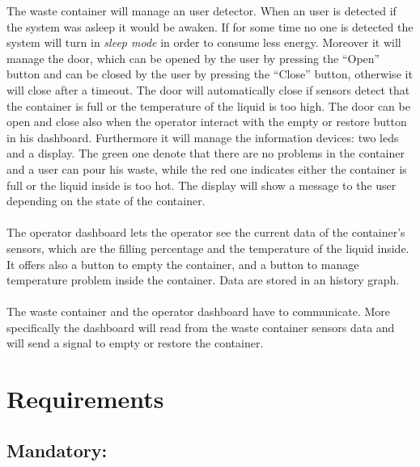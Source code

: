\documentclass[a4paper,12pt]{report}
\begin{document}
        The waste container will manage an user detector. When an user is detected if the system was asleep it would be awaken. If for some time no one is detected the system will turn in \textit{sleep mode} in order to consume less energy.
        Moreover it will manage the door, which can be opened by the user by pressing the ``Open'' button and can be closed by the user by pressing the ``Close'' button, otherwise it will close after a timeout. The door will automatically close if sensors detect that the container is full or the temperature of the liquid is too high. 
        The door can be open and close also when the operator interact with the empty or restore button in his dashboard.
        Furthermore it will manage the information devices: two leds and a display.
        The green one denote that there are no problems in the container and a user can pour his waste, while the red one indicates either the container is full or the liquid inside is too hot. 
        The display will show a message to the user depending on the state of the container.\\\\
        The operator dashboard lets the operator see the current data of the container's sensors, which are the filling percentage and the temperature of the liquid inside. It offers also a button to empty the container, and a button to manage temperature problem inside the container. Data are stored in an history graph.\\\\
        The waste container and the operator dashboard have to communicate. More specifically the dashboard will read from the waste container sensors data and will send a signal to empty or restore the container. 
            
    \section{Requirements}

        \subsection{Mandatory:}
\end{document}

